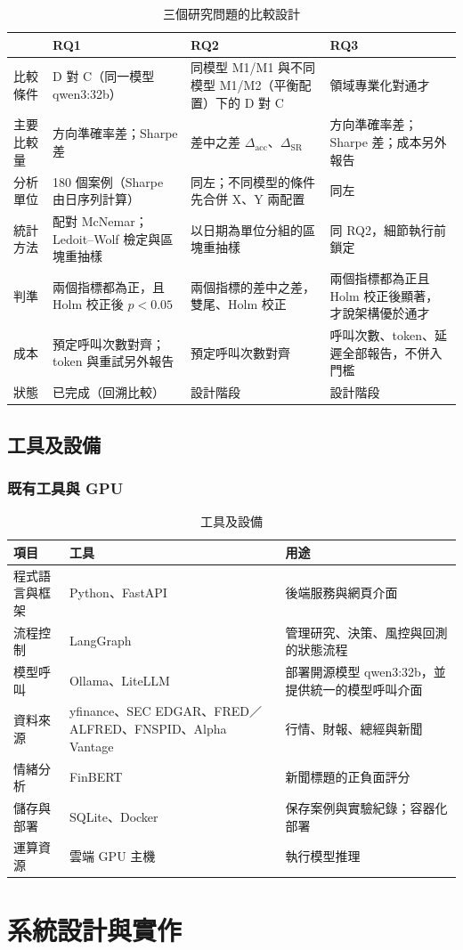 \documentclass[12pt,a4paper]{article}
\numberwithin{table}{section}
\numberwithin{figure}{section}
\begin{document}
\begin{table}[H]\centering\small
\caption{三個研究問題的比較設計}
\label{tab:rqcompare}
\begin{tabularx}{\textwidth}{@{}L{.13} Y Y Y@{}}\toprule
 & RQ1 & RQ2 & RQ3 \\\midrule
比較條件 & D 對 C（同一模型 qwen3:32b） & 同模型 M1/M1 與不同模型 M1/M2（平衡配置）下的 D 對 C & 領域專業化對通才 \\
主要比較量 & 方向準確率差；Sharpe 差 & 差中之差 $\Delta_{\mathrm{acc}}$、$\Delta_{\mathrm{SR}}$ & 方向準確率差；Sharpe 差；成本另外報告 \\
分析單位 & 180 個案例（Sharpe 由日序列計算） & 同左；不同模型的條件先合併 X、Y 兩配置 & 同左 \\
統計方法 & 配對 McNemar；Ledoit--Wolf 檢定與區塊重抽樣 & 以日期為單位分組的區塊重抽樣 & 同 RQ2，細節執行前鎖定 \\
判準 & 兩個指標都為正，且 Holm 校正後 $p<0.05$ & 兩個指標的差中之差，雙尾、Holm 校正 & 兩個指標都為正且 Holm 校正後顯著，才說架構優於通才 \\
成本 & 預定呼叫次數對齊；token 與重試另外報告 & 預定呼叫次數對齊 & 呼叫次數、token、延遲全部報告，不併入門檻 \\
狀態 & 已完成（回溯比較） & 設計階段 & 設計階段 \\
\bottomrule\end{tabularx}\end{table}

\subsection{工具及設備}

\subsubsection{既有工具與 GPU}
\begin{table}[H]
\centering\small
\caption{工具及設備}
\label{tab:tools}
\begin{tabularx}{\textwidth}{@{}L{.17} Y Y@{}}
\toprule
項目 & 工具 & 用途 \\
\midrule
程式語言與框架 & Python、FastAPI & 後端服務與網頁介面 \\
流程控制 & LangGraph & 管理研究、決策、風控與回測的狀態流程 \\
模型呼叫 & Ollama、LiteLLM & 部署開源模型 qwen3:32b，並提供統一的模型呼叫介面 \\
資料來源 & yfinance、\allowbreak SEC EDGAR、\allowbreak FRED／ALFRED、\allowbreak FNSPID、\allowbreak Alpha Vantage & 行情、財報、總經與新聞 \\
情緒分析 & FinBERT & 新聞標題的正負面評分 \\
儲存與部署 & SQLite、Docker & 保存案例與實驗紀錄；容器化部署 \\
運算資源 & 雲端 GPU 主機 & 執行模型推理 \\
\bottomrule
\end{tabularx}
\end{table}
\clearpage\section{系統設計與實作}
\end{document}
